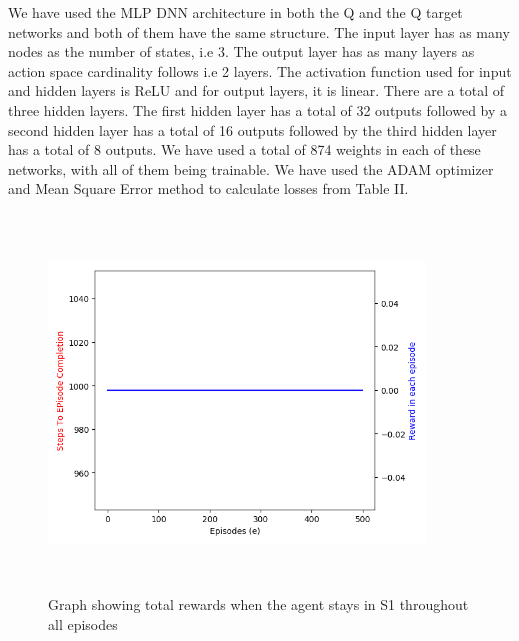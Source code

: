 \documentclass[conference]{IEEEtran}
\begin{document}
We have used the MLP DNN architecture in both the Q and the Q target networks and both of them have the same structure. The input layer has as many nodes as the number of states, i.e 3. The output layer has as many layers as action space cardinality follows	i.e 2 layers. The activation function used for input and hidden layers is ReLU and for output layers, it is linear. There are a total of three hidden layers. The first hidden layer has a total of 32 outputs followed by a second hidden layer has a total of 16 outputs followed by the third hidden layer has a total of 8 outputs. We have used a total of 874 weights in each of these networks, with all of them being trainable. We have used the ADAM optimizer and Mean Square Error method to calculate losses from Table II. \\

\begin{figure}[htbp]
\centerline{\includegraphics[width=10cm,height=10cm,keepaspectratio]{1-29_1.png}}
\caption{Graph showing total rewards when the agent stays in S1 throughout all episodes}
\label{fig}
\end{figure}
\end{document}
